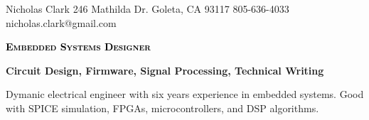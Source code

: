 \documentclass[letterpaper, 10pt]{article}
\newcommand{\NrcColorName}{MariPro}
\newcommand{\NrcColorTitle}{Black}
\begin{document}
%
\nrctitle
{\textcolor{\NrcColorName}{Nicholas Clark}}
{246 Mathilda Dr.}
{Goleta, CA 93117}
{805-636-4033}
{nicholas.clark@gmail.com}
%
\begin{center}\par\smallskip
\textcolor{\NrcColorTitle}{\Large \textbf{\textsc{Embedded Systems Designer}}}\par
\large \textbf{{Circuit Design, Firmware, Signal Processing, Technical Writing}}\par
\smallskip
\noindent \begin{minipage}[t]{0.75\textwidth}%
\begin{sloppypar}
Dymanic electrical engineer with six years experience in embedded systems. 
Good with SPICE simulation, FPGAs, microcontrollers, and DSP algorithms.
\end{sloppypar}
\end{minipage}
\end{center}
\par \smallskip \smallskip
%
%
\end{document}
